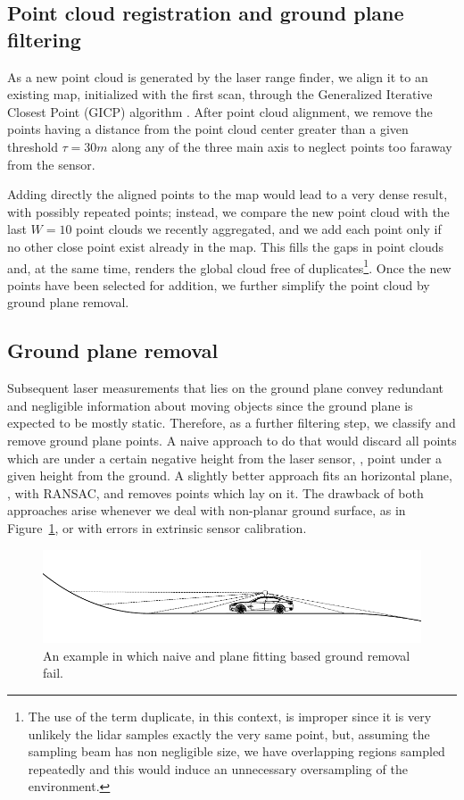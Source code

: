 \subsection{Point cloud registration and ground plane filtering}
As a new point cloud is generated by the laser range finder, we align it to an existing map, initialized with the first scan, through the Generalized Iterative Closest Point (GICP) algorithm \cite{segal2009generalized}.
%
After point cloud alignment, we remove the points having a distance from the point cloud center greater than a given threshold $\tau = 30m$ along any of the three main axis to neglect points too faraway from the sensor.

Adding directly the aligned points to the map would lead to a very dense result, with possibly repeated points; instead, we compare the new point cloud with the last $W=10$ 
point clouds we recently aggregated, and we add each point only if no other close point exist already in the map.
This fills the gaps in point clouds and, at the same time,  renders the global cloud free of duplicates\footnote{The use of the term duplicate, in this context, is improper since it is very unlikely the lidar samples exactly the very same point, but, assuming the sampling beam has non negligible size, we have overlapping regions sampled repeatedly and this would induce an unnecessary oversampling of the environment.}. Once the new points have been selected for addition, we further simplify the point cloud by ground plane removal.


\subsection{Ground plane removal}
\label{sec:ground_removal}
Subsequent laser measurements that lies on the ground plane convey redundant and negligible information about moving objects since the ground plane is expected to be mostly static. Therefore, as a further filtering step, we classify and remove ground plane points. 
A naive approach to do that would discard all points which are under a certain negative height from the laser sensor, \ie, point under a given height from the ground. 
A slightly better approach fits an horizontal plane, \eg, with RANSAC, and removes points which lay on it.
The drawback of both approaches arise whenever we deal with non-planar ground surface, as in Figure~\ref{fig:nonplane}, or with errors in extrinsic sensor calibration.

\begin{figure}
\includegraphics[width=0.99\columnwidth]{./img/ch-laser/./non-plane}
\caption{An example in which naive and plane fitting based ground removal fail.}
\label{fig:nonplane}
\end{figure}

